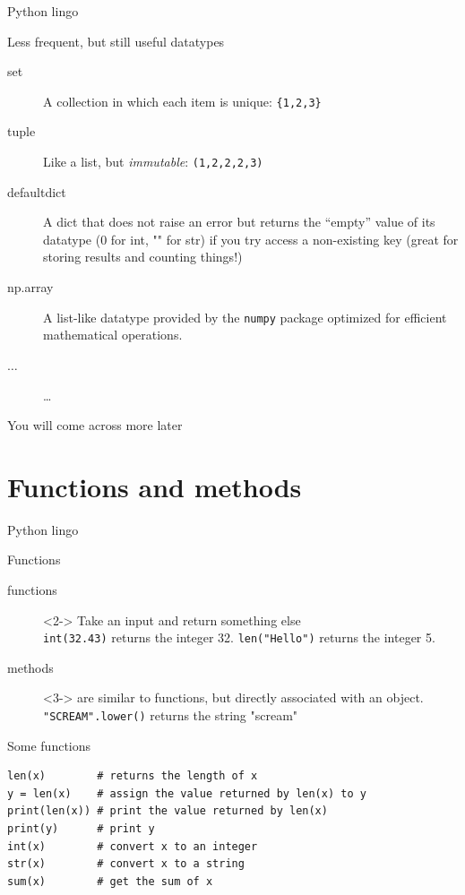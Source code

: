 \documentclass{beamer}
\begin{document}
\begin{frame}{Python lingo}
	\begin{block}{Less frequent, but still useful datatypes}
		\begin{description}
			\item[{\color{red}set}]A collection in which each item is unique: \texttt{\{1,2,3\}}
			\item[{\color{red}tuple}]Like a list, but \emph{immutable}: \texttt{(1,2,2,2,3)}
			\item[{\color{red}defaultdict}]A dict that does not raise an error but returns the ``empty'' value of its datatype (0 for int, "" for str) if you try access a non-existing key (great for storing results and counting things!)
			\item[{\color{red}np.array}]A list-like datatype provided by the \texttt{numpy} package optimized for efficient mathematical operations.
			\item[$\ldots$]\ldots
		\end{description}
	\end{block}
\small{You will come across more later}
\end{frame}



\section{Functions and methods}
\begin{frame}{Python lingo}
	\begin{block}{Functions}
		\begin{description}
			\item[{\color{red}functions}]<2-> Take an input and return something else \\ {\tt{int(32.43})} returns the integer 32. \texttt{len("Hello")} returns the integer 5.\\ 
			\item[{\color{red}methods}]<3-> are similar to functions, but directly associated with an object. {\tt{"SCREAM".lower()}} returns the string "scream"
		\end{description}
	\end{block}
\end{frame}



\begin{frame}[fragile]{Some functions}
\begin{lstlisting}
len(x)        # returns the length of x
y = len(x)    # assign the value returned by len(x) to y
print(len(x)) # print the value returned by len(x)
print(y)      # print y
int(x)        # convert x to an integer
str(x)        # convert x to a string
sum(x)        # get the sum of x
\end{lstlisting}
\end{frame}
\end{document}

